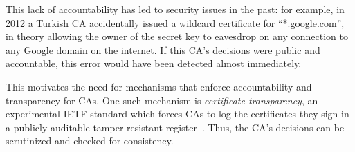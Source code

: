 This lack of accountability has led to security issues in the past:
for example, in 2012 a Turkish CA accidentally issued a wildcard
certificate for ``*.google.com'', in theory allowing the owner of the
secret key to eavesdrop on any connection to any Google domain on the
internet.  If this CA's decisions were public and accountable, this
error would have been detected almost immediately.

This motivates the need for mechanisms that enforce accountability
and transparency for CAs. One such mechanism is \emph{certificate transparency},
an experimental IETF standard which forces CAs to log the certificates they
sign in a publicly-auditable tamper-resistant register~\cite{...}. Thus, the CA's
decisions can be scrutinized and checked for consistency. 







